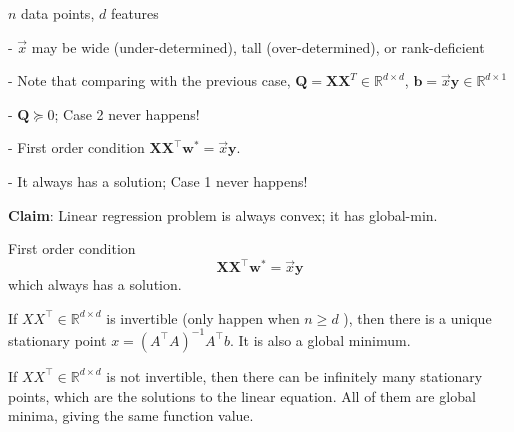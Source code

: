 \documentclass[11pt,a4paper]{article}
\begin{document}
$n$ data points, $d$ features

- $\vec{x}$ may be wide (under-determined), tall (over-determined), or rank-deficient

- Note that comparing with the previous case, $\mathbf{Q}=\mathbf{X X}^{T} \in \mathbb{R}^{d \times d}$, $\mathbf{b}=\vec{x} \mathbf{y} \in \mathbb{R}^{d \times 1}$

- $\mathbf{Q} \succeq 0$; Case 2 never happens!

- First order condition $\mathbf{X X}^{\top} \mathbf{w}^{*}=\vec{x} \mathbf{y}$.

\quad - It always has a solution; Case 1 never happens!

\textbf{Claim}: Linear regression problem is always convex; it has global-min.

First order condition
$$
\mathbf{X X}^{\top} \mathbf{w}^{*}=\vec{x} \mathbf{y}
$$
which always has a solution.

If $X X^{\top} \in \mathbb{R}^{d \times d}$ is invertible (only happen when $n \geq d$ ), then there is a unique stationary point $x=\left(A^{\top} A\right)^{-1} A^{\top} b$. It is also a global minimum.

If $X X^{\top} \in \mathbb{R}^{d \times d}$ is not invertible, then there can be infinitely many stationary points, which are the solutions to the linear equation.
All of them are global minima, giving the same function value.
\end{document}
